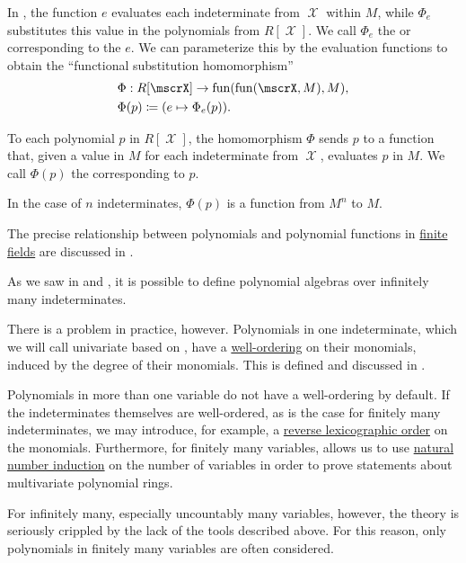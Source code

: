 \begin{remark}\label{rem:substitution_homomorphism}
  In , the function \( e \) evaluates each indeterminate from \( \mscrX \) within \( M \), while \( \Phi_e \) substitutes this value in the polynomials from \( R[\mscrX] \). We call \( \Phi_e \) the  or  corresponding to the  \( e \). We can parameterize this by the evaluation functions to obtain the \enquote{functional substitution homomorphism}
  \begin{equation*}
    \begin{aligned}
      &\Phi: R[\mscrX] \to \fun(\fun(\mscrX, M), M), \\
      &\Phi(p) \coloneqq (e \mapsto \Phi_e(p)).
    \end{aligned}
  \end{equation*}

  To each polynomial \( p \) in \( R[\mscrX] \), the homomorphism \( \Phi \) sends \( p \) to a function that, given a value in \( M \) for each indeterminate from \( \mscrX \), evaluates \( p \) in \( M \). We call \( \Phi(p) \) the  corresponding to \( p \).

  In the case of \( n \) indeterminates, \( \Phi(p) \) is a function from \( M^n \) to \( M \).

  The precise relationship between polynomials and polynomial functions in \hyperref[thm:finite_fields]{finite fields} are discussed in .
\end{remark}

\begin{remark}\label{rem:polynomials_over_infinitely_many_indeterminates}
  As we saw in  and , it is possible to define polynomial algebras over infinitely many indeterminates.

  There is a problem in practice, however. Polynomials in one indeterminate, which we will call univariate based on , have a \hyperref[def:well_ordered_set]{well-ordering} on their monomials, induced by the degree of their monomials. This is defined and discussed in .

  Polynomials in more than one variable do not have a well-ordering by default. If the indeterminates themselves are well-ordered, as is the case for finitely many indeterminates, we may introduce, for example, a \hyperref[def:lexicographic_order]{reverse lexicographic order} on the monomials. Furthermore, for finitely many variables,  allows us to use \hyperref[rem:induction/peano_arithmetic]{natural number induction} on the number of variables in order to prove statements about multivariate polynomial rings.

  For infinitely many, especially uncountably many variables, however, the theory is seriously crippled by the lack of the tools described above. For this reason, only polynomials in finitely many variables are often considered.
\end{remark}

